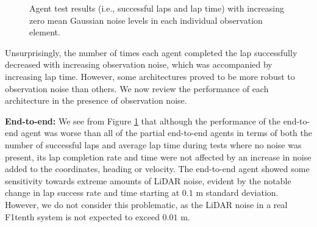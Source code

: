 \begin{figure}[htb!]
    \centering
    
    \caption[Agent performance with noise in each observation element]{Agent test results (i.e., successful laps and lap time) with increasing zero mean Gaussian noise levels in each individual observation element.}
    \label{fig:noise_vary}
\end{figure}

Unsurprisingly, the number of times each agent completed the lap successfully decreased with increasing observation noise, which was accompanied by increasing lap time.
However, some architectures proved to be more robust to observation noise than others.
We now review the performance of each architecture in the presence of observation noise.

\textbf{End-to-end:}
We see from Figure \ref{fig:noise_vary} that although the performance of the end-to-end agent was worse than all of the partial end-to-end agents in terms of both the number of successful laps and average lap time during tests where no noise was present, its lap completion rate and time were not affected by an increase in noise added to the coordinates, heading or velocity.
The end-to-end agent showed some sensitivity towards extreme amounts of LiDAR noise, evident by the notable change in lap success rate and time starting at $0.1$ m standard deviation. 
However, we do not consider this problematic, as the LiDAR noise in a real F1tenth system is not expected to exceed $0.01$ m.



%     

